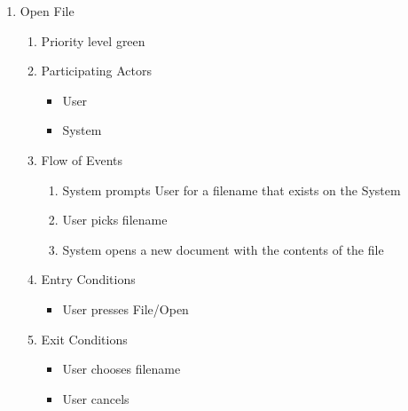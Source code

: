\documentclass[a4paper, 12pt]{article}
\begin{document}
\begin{enumerate}
	\item{Open File}
	\begin{enumerate}
		\item{Priority} level green
		\item{Participating Actors}
		\begin {itemize}
			\item User
			\item System
		\end{itemize}
		\item{Flow of Events}
		\begin{enumerate}
			\item {System prompts User for a filename that exists on the System}
			\item {User picks filename}
			\item {System opens a new document with the contents of the file}
		\end{enumerate}
		\item {Entry Conditions}
		\begin{itemize}
			\item User presses File/Open
		\end{itemize}
		\item Exit Conditions
		\begin{itemize}
			\item User chooses filename
			\item User cancels
		\end{itemize}
	\end {enumerate}


\end{enumerate}
\end{document}
